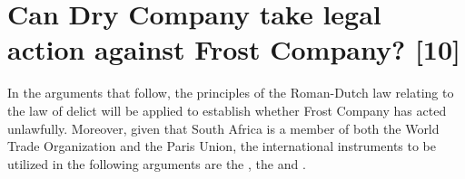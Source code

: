 \documentclass[11pt]{article}
\begin{document}
\section{Can Dry Company take legal action against Frost Company? \textbf{[10]}}
\label{sec:orged68b07}
In the arguments that follow, the principles of the Roman-Dutch law relating to
the law of delict will be applied to establish whether Frost Company has acted
unlawfully. Moreover, given that South Africa is a member of both the World
Trade Organization and the Paris Union, the international instruments to be
utilized in the following arguments are the
 \cite{wipo83_paris_conve_protect_ip}, the
 \cite{wipo96_model_provi_unfair_comp} and
 \cite{wto17_trips}.
\end{document}
